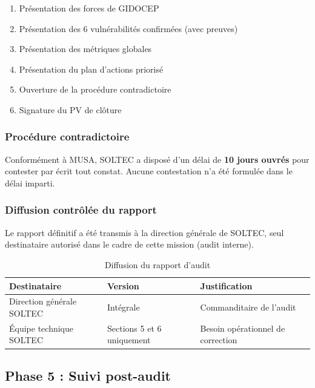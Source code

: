 \documentclass[12pt,a4paper,oneside]{report}
\begin{document}
\begin{enumerate}[leftmargin=*, itemsep=2pt]
	\item Présentation des forces de GIDOCEP
	\item Présentation des 6 vulnérabilités confirmées (avec preuves)
	\item Présentation des métriques globales
	\item Présentation du plan d'actions priorisé
	\item Ouverture de la procédure contradictoire
	\item Signature du PV de clôture
\end{enumerate}

\subsubsection{Procédure contradictoire}

Conformément à MUSA, SOLTEC a disposé d'un délai de \textbf{10 jours ouvrés} pour contester par écrit tout constat. Aucune contestation n'a été formulée dans le délai imparti.

\subsubsection{Diffusion contrôlée du rapport}

Le rapport définitif a été transmis à la direction générale de SOLTEC, seul destinataire autorisé dans le cadre de cette mission (audit interne).

\begin{table}[H]
	\centering
	\caption{Diffusion du rapport d'audit}
	\label{tab:diffusion_ch3}
	\begin{tabular}{|p{4.5cm}|p{3cm}|p{7cm}|}
		\hline
		\textbf{Destinataire} & \textbf{Version} & \textbf{Justification} \\
		\hline
		Direction générale SOLTEC & Intégrale & Commanditaire de l'audit \\
		\hline
		Équipe technique SOLTEC & Sections 5 et 6 uniquement & Besoin opérationnel de correction \\
		\hline
	\end{tabular}
\end{table}
\subsection{Phase 5 : Suivi post-audit}
\end{document}
